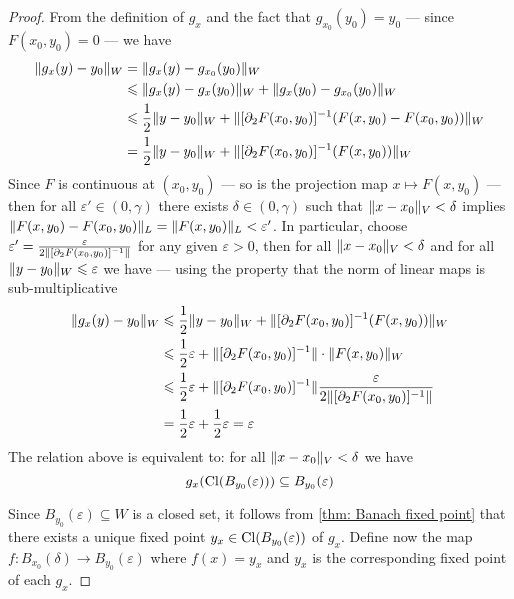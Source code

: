 \begin{proof}
    From the definition of \(g_x\) and the fact that \(g_{x_0}(y_0) = y_0\) ---
    since \(F(x_0, y_0) = 0\) --- we have
    \begin{align*}
        \lVert g_x(y) - y_0\rVert_W
         & = \lVert g_x(y) - g_{x_0}(y_0)\rVert_W                                                   \\
         & \leqslant \lVert g_x(y) - g_{x}(y_0)\rVert_W + \lVert g_x(y_0) - g_{x_0}(y_0)\rVert_W               \\
         & \leqslant \frac{1}{2} \lVert y - y_0\rVert_W + \lVert[\partial_2F(x_0, y_0)]^{-1}(F(x, y_0) -
        F(x_0, y_0))\rVert_W                                                                       \\
         & = \frac{1}{2} \lVert y - y_0\rVert_W
        + \lVert[\partial_{2}F(x_{0}, y_{0})]^{-1}(F(x, y_0))\rVert_W
    \end{align*}
    Since \(F\) is continuous at \((x_{0}, y_0)\) --- so is the projection
    map \(x \mapsto F(x, y_0)\) --- then for all \(\varepsilon' \in (0, \gamma)\) there
    exists \(\delta \in (0, \gamma)\) such that \(\lVert x - x_0\rVert_V < \delta\) implies \(\lVert F(x, y_0) -
        F(x_0, y_0)\rVert_L = \lVert F(x, y_0)\rVert_L < \varepsilon'\). In particular, choose \(\varepsilon' =
    \frac{\varepsilon}{2 \lVert[\partial_{2}F(x_0, y_0)]^{-1}\rVert}\) for any given \(\varepsilon > 0\), then for
    all \(\lVert x - x_0\rVert_V < \delta\) and for all \(\lVert y - y_0\rVert_W \leqslant \varepsilon\) we have --- using
    the property that the norm of linear maps is sub-multiplicative
    \begin{align*}
        \lVert g_x(y) - y_0\rVert_{W}
         & \leqslant \frac{1}{2} \lVert y - y_0\rVert_{W} + \lVert[\partial_2F(x_0, y_0)]^{-1}(F(x, y_0))\rVert_W
        \\
         & \leqslant \frac{1}{2} \varepsilon + \lVert[\partial_2F(x_0, y_0)]^{-1}\rVert \cdot \lVert F(x, y_0)\rVert_W
        \\
         & \leqslant \frac{1}{2}\varepsilon
        + \lVert[\partial_2F(x_0, y_0)]^{-1}\rVert \frac{\varepsilon}{2 \lVert[\partial_2F(x_0, y_0)]^{-1}\rVert}
        \\
         & = \frac{1}{2} \varepsilon + \frac{1}{2}\varepsilon = \varepsilon
    \end{align*}
    The relation above is equivalent to: for all \(\lVert x - x_0\rVert_V < \delta\) we
    have
    \[
        g_x(\operatorname{Cl}(B_{y_0}(\varepsilon))) \subseteq B_{y_0}(\varepsilon)
    \]

    Since \(B_{y_0}(\varepsilon) \subseteq W\) is a closed set, it follows from
    \cref{thm: Banach fixed point} that there exists a unique fixed point
    \(y_x \in \operatorname{Cl}(B_{y_0}(\varepsilon))\) of \(g_{x}\). Define now the map
    \(f: B_{x_0}(\delta) \to B_{y_0}(\varepsilon)\) where \(f(x) = y_{x}\) and
    \(y_x\) is the corresponding fixed point of each \(g_x\).


\end{proof}
